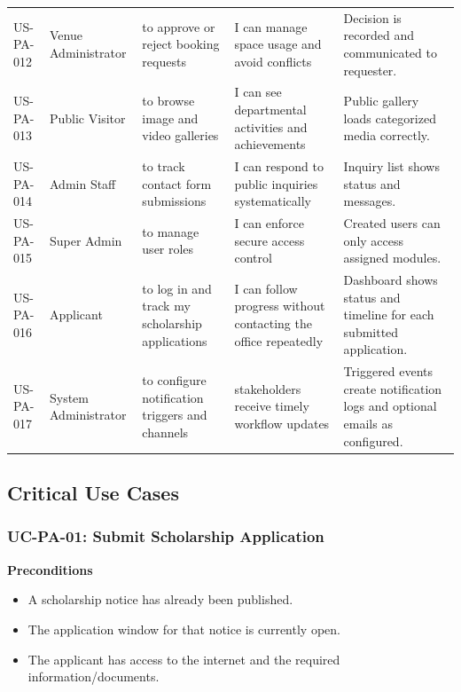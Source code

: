\documentclass[12pt,a4paper]{article}
\begin{document}
\begin{longtable}{@{}L{1.9cm}L{2.5cm}L{3.4cm}L{3.7cm}L{3.2cm}@{}}
US-PA-012 & Venue Administrator & to approve or reject booking requests & I can manage space usage and avoid conflicts & Decision is recorded and communicated to requester. \\
US-PA-013 & Public Visitor & to browse image and video galleries & I can see departmental activities and achievements & Public gallery loads categorized media correctly. \\
US-PA-014 & Admin Staff & to track contact form submissions & I can respond to public inquiries systematically & Inquiry list shows status and messages. \\
US-PA-015 & Super Admin & to manage user roles & I can enforce secure access control & Created users can only access assigned modules. \\
US-PA-016 & Applicant & to log in and track my scholarship applications & I can follow progress without contacting the office repeatedly & Dashboard shows status and timeline for each submitted application. \\
US-PA-017 & System Administrator & to configure notification triggers and channels & stakeholders receive timely workflow updates & Triggered events create notification logs and optional emails as configured. \\
\bottomrule
\end{longtable}

\subsection{Critical Use Cases}

\subsubsection*{UC-PA-01: Submit Scholarship Application}

\textbf{Preconditions}
\begin{itemize}[nosep]
\item A scholarship notice has already been published.
\item The application window for that notice is currently open.
\item The applicant has access to the internet and the required information/documents.
\end{itemize}
\end{document}
